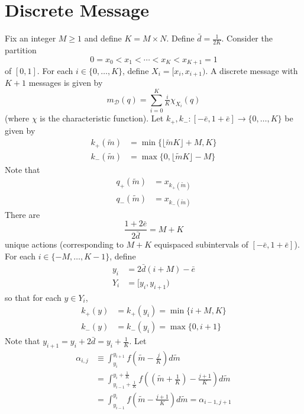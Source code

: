\documentclass[12pt]{article}
\begin{document}
\section{Discrete Message}
Fix an integer $M\geq1$ and define $K=M\times N$. Define $\bar{d}=\frac{1}{2K}$. Consider the partition
\begin{equation}\label{eq:partition}
	0=x_{0}<x_{1}<\cdots<x_{K}<x_{K+1}=1
\end{equation}
of $[0,1]$. For each $i\in\{0,\ldots,K\}$, define $X_{i}=[x_{i},x_{i+1})$. A discrete message with $K+1$ messages is given by
\begin{equation}
	m_{\mathcal{D}}(q)=\sum_{i=0}^{K}{\tfrac{i}{K}\chi_{X_{i}}(q)}
\end{equation}
(where $\chi$ is the characteristic function). Let $k_{+},k_{-}:[-\bar{e},1+\bar{e}]\rightarrow\{0,\ldots,K\}$ be given by
\begin{align}
	k_{+}(\widetilde{m})&=\min\{\lfloor \widetilde{m}K\rfloor+M,K\}\\
	k_{-}(\widetilde{m})&=\max\{0,\lfloor \widetilde{m}K\rfloor-M\}
\end{align}
Note that 
\begin{align}
	q_{+}(\widetilde{m})&=x_{k_{+}(\widetilde{m})}\\
	q_{-}(\widetilde{m})&=x_{k_{-}(\widetilde{m})}
\end{align}
There are 
\begin{equation}
	\frac{1+2\bar{e}}{2\bar{d}}=M+K
\end{equation}
unique actions (corresponding to $M+K$ equispaced subintervals of $[-\bar{e},1+\bar{e}]$). For each $i\in\{-M,\ldots,K-1\}$, define
\begin{align}
	y_{i}&=2\bar{d}(i+M)-\bar{e}\\ %
	Y_{i}&=[y_{i},y_{i+1})
\end{align}
so that for each $y\in Y_{i}$, 
\begin{align}
	k_{+}(y)&=k_{+}(y_{i})=\min\{i+M,K\}\\
	k_{-}(y)&=k_{-}(y_{i})=\max\{0,i+1\}
\end{align}
Note that $y_{i+1}=y_{i}+2\bar{d}=y_{i}+\tfrac{1}{K}$. Let
\begin{align}
	\alpha_{i,j}&\equiv\int_{y_{i}}^{y_{i+1}}{f\left(\widetilde{m}-\tfrac{j}{K}\right)d\widetilde{m}}\\
	&=\int_{y_{i-1}+\tfrac{1}{K}}^{y_{i}+\tfrac{1}{K}}{f\left(\left(\widetilde{m}+\tfrac{1}{K}\right)-\tfrac{j+1}{K}\right)d\widetilde{m}}\\
	&=\int_{y_{i-1}}^{y_{i}}{f\left(\widetilde{m}-\tfrac{j+1}{K}\right)d\widetilde{m}}=\alpha_{i-1,j+1}
\end{align}
\end{document}

